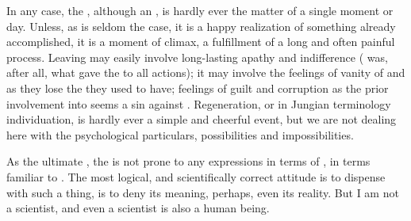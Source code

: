 In any case, the \sch, although an , is hardly ever the matter
of a single moment or day.  Unless, as is seldom the case, it is a
happy realization of something already accomplished, it is a moment of
climax, a fulfillment of a long and often painful process.
Leaving  may easily involve long-lasting apathy and
indifference ( was, after all, what gave the  to all
 actions); it may involve the feelings of vanity of  and  as they lose the  they used to
have; feelings of guilt and corruption as the prior involvement into
 seems a sin against .  Regeneration,
or in Jungian terminology individuation, is hardly ever a simple and
cheerful event, but we are not dealing here with the psychological
particulars, possibilities and impossibilities.


\pa
As the ultimate , the  is not
prone to any  expressions in terms of , in terms
familiar to .  The most logical, and scientifically
correct attitude is to dispense with such a thing, is to deny its
meaning, perhaps, even its reality.  But I am not a scientist, and
even a scientist is also a human being.

